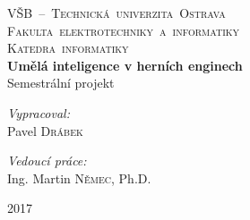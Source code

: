 
\begin{titlepage}
\begin{center}
\textsc{
	\LARGE 
	\mbox{VŠB – Technická univerzita Ostrava}\\
	\mbox{Fakulta elektrotechniky a informatiky}\\
	\mbox{Katedra informatiky}
}\\[3.5cm]
{ \huge \bfseries Umělá inteligence v herních enginech}\\[1.4cm]
\Large Semestrální projekt\\[0.5cm]
\begin{minipage}{0.4\textwidth}
\begin{flushleft} \large
\emph{Vypracoval:}\\
Pavel \textsc{Drábek}
\end{flushleft}
\end{minipage}
\begin{minipage}{0.5\textwidth}
\begin{flushright} \large
\emph{Vedoucí práce:} \\
Ing. Martin \textsc{Němec}, Ph.D.
\end{flushright}
\end{minipage}
\vfill
{\large 2017}
\end{center}
\end{titlepage}

